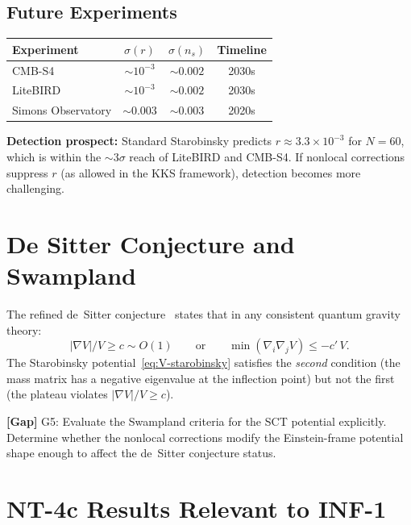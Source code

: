 \documentclass[11pt,a4paper]{article}
\theoremstyle{plain}
\theoremstyle{definition}
\newcommand{\gap}[1]{%
  \par\smallskip\noindent
  \colorbox{yellow!15}{\parbox{\dimexpr\linewidth-2\fboxsep}{%
    \textcolor{orange!70!black}{\textbf{[Gap]}} #1}}%
  \par\smallskip}
\begin{document}
\subsection{Future Experiments}

\begin{center}
\renewcommand{\arraystretch}{1.3}
\begin{tabular}{lccc}
\toprule
Experiment & $\sigma(r)$ & $\sigma(n_s)$ & Timeline \\
\midrule
CMB-S4 & $\sim 10^{-3}$ & $\sim 0.002$ & 2030s \\
LiteBIRD & $\sim 10^{-3}$ & $\sim 0.002$ & 2030s \\
Simons Observatory & $\sim 0.003$ & $\sim 0.003$ & 2020s \\
\bottomrule
\end{tabular}
\end{center}

\textbf{Detection prospect:} Standard Starobinsky predicts
$r \approx 3.3 \times 10^{-3}$ for $N = 60$, which is within the
$\sim 3\sigma$ reach of LiteBIRD and CMB-S4. If nonlocal corrections
suppress $r$ (as allowed in the KKS framework), detection becomes
more challenging.

\section{De Sitter Conjecture and Swampland}\label{sec:swampland}

The refined de~Sitter conjecture~\cite{OPSV18} states that in any
consistent quantum gravity theory:
\begin{equation}\label{eq:dS-conjecture}
  |\nabla V|/V \geq c \sim O(1)
  \qquad\text{or}\qquad
  \min(\nabla_i\nabla_j V) \leq -c'\,V.
\end{equation}
The Starobinsky potential~\eqref{eq:V-starobinsky} satisfies the
\emph{second} condition (the mass matrix has a negative eigenvalue at
the inflection point) but not the first (the plateau violates
$|\nabla V|/V \geq c$).

\gap{G5: Evaluate the Swampland criteria for the SCT
potential explicitly. Determine whether the nonlocal corrections
modify the Einstein-frame potential shape enough to affect the
de~Sitter conjecture status.}

\section{NT-4c Results Relevant to INF-1}\label{sec:nt4c}
\end{document}
